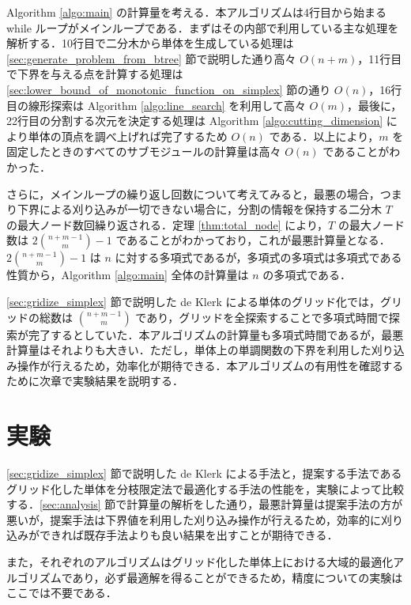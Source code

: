 \documentclass[a4paper,11pt]{jreport}
\begin{document}
Algorithm \ref{algo:main} の計算量を考える．本アルゴリズムは4行目から始まる while ループがメインループである．まずはその内部で利用している主な処理を解析する．10行目で二分木から単体を生成している処理は \ref{sec:generate_problem_from_btree} 節で説明した通り高々 $ O(n + m) $，11行目で下界を与える点を計算する処理は \ref{sec:lower_bound_of_monotonic_function_on_simplex} 節の通り $ O(n) $，16行目の線形探索は Algorithm \ref{algo:line_search} を利用して高々 $ O(m) $，最後に，22行目の分割する次元を決定する処理は Algorithm \ref{algo:cutting_dimension} により単体の頂点を調べ上げれば完了するため $ O(n) $ である．以上により，$ m $ を固定したときのすべてのサブモジュールの計算量は高々 $ O(n) $ であることがわかった．\par
さらに，メインループの繰り返し回数について考えてみると，最悪の場合，つまり下界による刈り込みが一切できない場合に，分割の情報を保持する二分木 $ T $ の最大ノード数回繰り返される．定理 \ref{thm:total_node} により，$ T $ の最大ノード数は $ 2 \binom{n + m - 1}{m} - 1 $ であることがわかっており，これが最悪計算量となる．$ 2 \binom{n + m - 1}{m} - 1 $ は $ n $ に対する多項式であるが，多項式の多項式は多項式である性質から，Algorithm \ref{algo:main} 全体の計算量は $ n $ の多項式である．\par
\ref{sec:gridize_simplex} 節で説明した de Klerk による単体のグリッド化では，グリッドの総数は $ \binom{n + m - 1}{m} $ であり，グリッドを全探索することで多項式時間で探索が完了するとしていた．本アルゴリズムの計算量も多項式時間であるが，最悪計算量はそれよりも大きい．ただし，単体上の単調関数の下界を利用した刈り込み操作が行えるため，効率化が期待できる．本アルゴリズムの有用性を確認するために次章で実験結果を説明する．

\chapter{実験}

\ref{sec:gridize_simplex} 節で説明した de Klerk による手法と，提案する手法であるグリッド化した単体を分枝限定法で最適化する手法の性能を，実験によって比較する．\ref{sec:analysis} 節で計算量の解析をした通り，最悪計算量は提案手法の方が悪いが，提案手法は下界値を利用した刈り込み操作が行えるため，効率的に刈り込みができれば既存手法よりも良い結果を出すことが期待できる．\par
また，それぞれのアルゴリズムはグリッド化した単体上における大域的最適化アルゴリズムであり，必ず最適解を得ることができるため，精度についての実験はここでは不要である．\par
\end{document}
